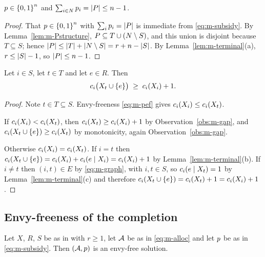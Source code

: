 \begin{lemma}
\label{lem:m-budget}
$p \in \left\{0,1\right\}^n$ and $\sum_{i \in N} p_i = \left\lvert P\right\rvert \le n-1$.
\end{lemma}

\begin{proof}
That $p \in \left\{0,1\right\}^n$ with $\sum_i p_i = \left\lvert P\right\rvert$ is immediate
from \eqref{eq:m-subsidy}. By Lemma~\ref{lem:m-Pstructure},
$P \subseteq T \cup (N \setminus S)$, and this union is disjoint because
$T \subseteq S$; hence
$\left\lvert P\right\rvert \le \left\lvert T\right\rvert + \left\lvert N \setminus S\right\rvert = r + n - \left\lvert S\right\rvert$. By
Lemma~\ref{lem:m-terminal}(a), $r \le \left\lvert S\right\rvert - 1$, so $\left\lvert P\right\rvert \le n-1$.
\end{proof}

\begin{lemma}
\label{lem:m-expensive}
Let $i \in S$, let $t \in T$ and let $e \in R$. Then
\[
  c_i\bigl(X_t \cup \left\{e\right\}\bigr) \;\ge\; c_i(X_i) + 1 .
\]
\end{lemma}

\begin{proof}
Note $t \in T \subseteq S$. Envy-freeness \eqref{eq:m-pef} gives
$c_i(X_i) \le c_i(X_t)$.

If $c_i(X_i) < c_i(X_t)$, then $c_i(X_t) \ge c_i(X_i) + 1$ by
Observation~\ref{obs:m-gap}, and $c_i(X_t \cup \left\{e\right\}) \ge c_i(X_t)$ by
monotonicity, again Observation~\ref{obs:m-gap}.

Otherwise $c_i(X_i) = c_i(X_t)$. If $i = t$ then
$c_i(X_t \cup \left\{e\right\}) = c_i(X_i) + c_i(e \mid X_i) = c_i(X_i)+1$
by Lemma~\ref{lem:m-terminal}(b). If $i \ne t$ then $(i,t) \in E$ by
\eqref{eq:m-graph}, with $i,t \in S$, so $c_i(e \mid X_t) = 1$ by
Lemma~\ref{lem:m-terminal}(c) and therefore
$c_i(X_t \cup \left\{e\right\}) = c_i(X_t) + 1 = c_i(X_i) + 1$.
\end{proof}

\subsection{Envy-freeness of the completion}
\label{sec:m-ef}

\begin{theorem}
\label{thm:m-completion}
Let $X$, $R$, $S$ be as in  with $r \ge 1$, let $\mathcal{A}$
be as in \eqref{eq:m-alloc} and let $p$ be as in \eqref{eq:m-subsidy}.
Then $(\mathcal{A},p)$ is an envy-free solution.
\end{theorem}

